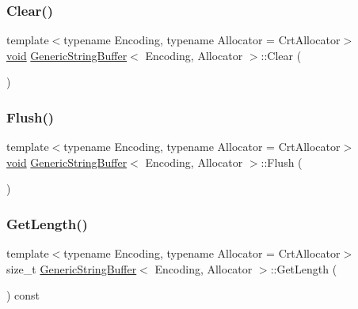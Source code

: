 \subsubsection{\texorpdfstring{Clear()}{Clear()}}
{\footnotesize\ttfamily template$<$typename Encoding, typename Allocator = Crt\+Allocator$>$ \\
\hyperlink{imgui__impl__opengl3__loader_8h_ac668e7cffd9e2e9cfee428b9b2f34fa7}{void} \hyperlink{classGenericStringBuffer}{Generic\+String\+Buffer}$<$ Encoding, Allocator $>$\+::Clear (\begin{DoxyParamCaption}{ }\end{DoxyParamCaption})\hspace{0.3cm}{\ttfamily [inline]}}

\mbox{\label{classGenericStringBuffer_a28bb539487db17b07314a532f3b8847c}} 
\subsubsection{\texorpdfstring{Flush()}{Flush()}}
{\footnotesize\ttfamily template$<$typename Encoding, typename Allocator = Crt\+Allocator$>$ \\
\hyperlink{imgui__impl__opengl3__loader_8h_ac668e7cffd9e2e9cfee428b9b2f34fa7}{void} \hyperlink{classGenericStringBuffer}{Generic\+String\+Buffer}$<$ Encoding, Allocator $>$\+::Flush (\begin{DoxyParamCaption}{ }\end{DoxyParamCaption})\hspace{0.3cm}{\ttfamily [inline]}}

\mbox{\label{classGenericStringBuffer_ad324b8154be3354dda3aa4a0a7361499}} 
\subsubsection{\texorpdfstring{Get\+Length()}{GetLength()}}
{\footnotesize\ttfamily template$<$typename Encoding, typename Allocator = Crt\+Allocator$>$ \\
size\+\_\+t \hyperlink{classGenericStringBuffer}{Generic\+String\+Buffer}$<$ Encoding, Allocator $>$\+::Get\+Length (\begin{DoxyParamCaption}{ }\end{DoxyParamCaption}) const\hspace{0.3cm}{\ttfamily [inline]}}



